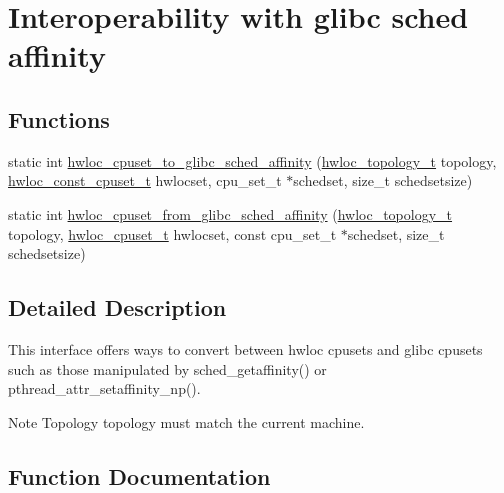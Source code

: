 \hypertarget{a00217}{}\section{Interoperability with glibc sched affinity}
\label{a00217}
\subsection*{Functions}
\begin{DoxyCompactItemize}
\item 
static int \hyperlink{a00217_ga88699a0c86c66a9b7baa3468cd9d24c3}{hwloc\+\_\+cpuset\+\_\+to\+\_\+glibc\+\_\+sched\+\_\+affinity} (\hyperlink{a00186_ga9d1e76ee15a7dee158b786c30b6a6e38}{hwloc\+\_\+topology\+\_\+t} topology, \hyperlink{a00183_ga1f784433e9b606261f62d1134f6a3b25}{hwloc\+\_\+const\+\_\+cpuset\+\_\+t} hwlocset, cpu\+\_\+set\+\_\+t $\ast$schedset, size\+\_\+t schedsetsize)
\item 
static int \hyperlink{a00217_ga8ec807ec17de57fa77aa5cfd6c8e4bfb}{hwloc\+\_\+cpuset\+\_\+from\+\_\+glibc\+\_\+sched\+\_\+affinity} (\hyperlink{a00186_ga9d1e76ee15a7dee158b786c30b6a6e38}{hwloc\+\_\+topology\+\_\+t} topology, \hyperlink{a00183_ga4bbf39b68b6f568fb92739e7c0ea7801}{hwloc\+\_\+cpuset\+\_\+t} hwlocset, const cpu\+\_\+set\+\_\+t $\ast$schedset, size\+\_\+t schedsetsize)
\end{DoxyCompactItemize}


\subsection{Detailed Description}
This interface offers ways to convert between hwloc cpusets and glibc cpusets such as those manipulated by sched\+\_\+getaffinity() or pthread\+\_\+attr\+\_\+setaffinity\+\_\+np().

\begin{DoxyNote}{Note}
Topology {\ttfamily topology} must match the current machine. 
\end{DoxyNote}


\subsection{Function Documentation}
\mbox{\label{a00217_ga8ec807ec17de57fa77aa5cfd6c8e4bfb}} 
